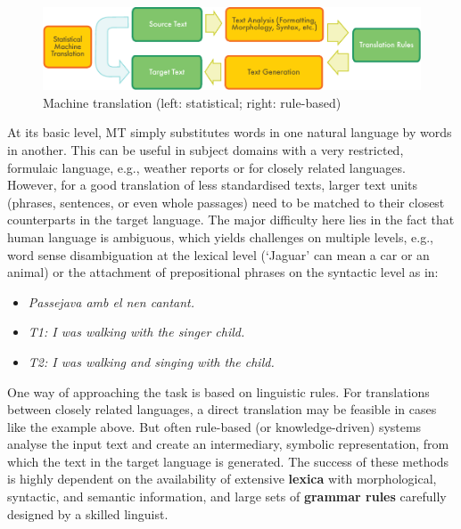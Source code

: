 \begin{multicols}{2}
\begin{figure}[htb]
  \center
  \includegraphics[width=\textwidth]{../_media/english/machine_translation}
  \caption{Machine translation (left: statistical; right: rule-based)}
  \label{fig:mtarch_en}
\end{figure}

At its basic level, MT simply substitutes words in one natural language by words in another. This can be useful in subject domains with a very restricted, formulaic language, e.g., weather reports or for closely related languages. However, for a good translation of less standardised texts, larger text units (phrases, sentences, or even whole passages) need to be matched to their closest counterparts in the target language. The major difficulty here lies in the fact that human language is ambiguous, which yields challenges on multiple levels, e.g., word sense disambiguation at the lexical level (‘Jaguar’ can mean a car or an animal) or the attachment of prepositional phrases on the syntactic level as in:
\begin{itemize}
\item \textit{Passejava amb el nen cantant.}
\item \textit{T1: I was walking with the singer child.}
\item \textit{T2: I was walking and singing with the child.}
\end{itemize}

One way of approaching the task is based on linguistic rules. For translations between closely related languages, a direct translation may be feasible in cases like the example above. But often rule-based (or knowledge-driven) systems analyse the input text and create an intermediary, symbolic representation, from which the text in the target language is generated. The success of these methods is highly dependent on the availability of extensive \textbf{lexica} with morphological, syntactic, and semantic information, and large sets of \textbf{grammar rules} carefully designed by a skilled linguist.


\end{multicols}
